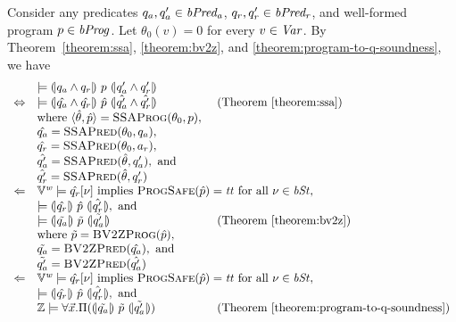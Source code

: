 
Consider any predicates $q_a, q_a' \in \mathit{bPred_a}$, $q_r, q_r' \in \mathit{bPred_r}$, and well-formed program $p \in
\mathit{bProg}$. Let $\theta_0 (v) = 0$ for every $v \in \mathit{Var}$. By
Theorem~\ref{theorem:ssa}, \ref{theorem:bv2z}, and \ref{theorem:program-to-q-soundness}, we have
\begin{equation*}
  \begin{array}{cll}
    & \models \hoaretriple{q_a \wedge q_r}{p}{q_a' \wedge q_r'}\\
    \Leftrightarrow
    & \models
      \hoaretriple{\hat{q_a} \wedge \hat{q_r}}
      {\hat{p}}
      {\hat{q_a'} \wedge \hat{q_r'}}
    & \textmd{ (Theorem~\ref{theorem:ssa})}\\
    &
      \textmd{where } \langle \hat{\theta}, \hat{p} \rangle =
      \textsc{SSAProg} (\theta_0, p), \\
    & \hat{q_a} = \textsc{SSAPred}(\theta_0, q_a), \\
    & \hat{q_r} = \textsc{SSAPred}(\theta_0, a_r), \\
    & \hat{q_a'} = \textsc{SSAPred}(\hat{\theta}, q_a'), \textmd{ and} \\
    & \hat{q_r'} = \textsc{SSAPred}(\hat{\theta}, q_r') \\
    \Leftarrow
    & \multicolumn{2}{l}{\BV^\wordsize \models \hat{q_r}[\bvst] \textmd{ implies } \textsc{ProgSafe}(\hat{p}) = \btt \textmd{ for all } \bvst \in \bvSt,} \\
    & \models \hoaretriple{\hat{q_r}}{\hat{p}}{\hat{q_r'}}, \textmd{ and } \\
    & \models \hoaretriple{\tilde{q_a}}{\tilde{p}}{\tilde{q_a'}}
    & \textmd{ (Theorem~\ref{theorem:bv2z})} \\
    & \textmd{where } \tilde{p} = \textsc{BV2ZProg}(\hat{p}), \\
    & \tilde{q_a} = \textsc{BV2ZPred}(\hat{q_a}), \textmd{ and} \\
    & \tilde{q_a'} = \textsc{BV2ZPred}(\hat{q_a'}) \\
    \Leftarrow
    & \multicolumn{2}{l}{\BV^\wordsize \models \hat{q_r}[\bvst] \textmd{ implies } \textsc{ProgSafe}(\hat{p}) = \btt \textmd{ for all } \bvst \in \bvSt,} \\
    & \models \hoaretriple{\hat{q_r}}{\hat{p}}{\hat{q_r'}}, \textmd{ and } \\
    & \bbfZ \models \forall \vx.
      \Pi (\hoaretriple{\tilde{q_a}}{\tilde{p}}{\tilde{q_a'}})
    & \textmd{ (Theorem~\ref{theorem:program-to-q-soundness})}
  \end{array}
\end{equation*}
